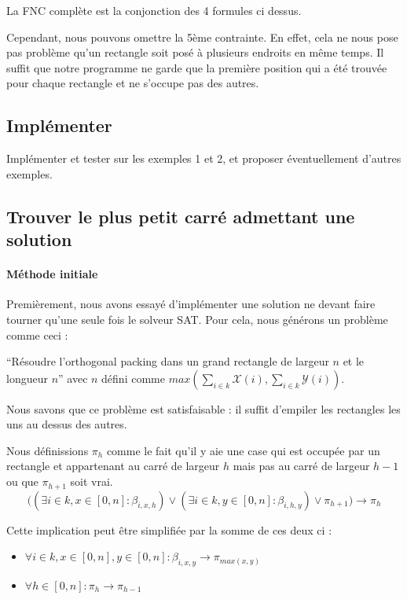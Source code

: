 \documentclass[a4paper]{article}
\begin{document}
La FNC complète est la conjonction des 4 formules ci dessus.

Cependant, nous pouvons omettre la 5ème contrainte. En effet, cela ne nous pose pas problème qu'un rectangle soit posé à plusieurs endroits en même temps. Il suffit que notre programme ne garde que la première position qui a été trouvée pour chaque rectangle et ne s'occupe pas des autres.

\subsection{Implémenter}

Implémenter et tester sur les exemples 1 et 2, et proposer éventuellement
d’autres exemples.

\subsection{Trouver le plus petit carré admettant une solution}

\paragraph{Méthode initiale} Premièrement, nous avons essayé d'implémenter une solution ne devant faire tourner qu'une seule fois le solveur SAT.
Pour cela, nous générons un problème comme ceci :

``Résoudre l'orthogonal packing dans un grand rectangle de largeur $n$ et le longueur $n$'' avec $n$ défini comme $max(\sum_{i \in k} \mathcal{X}(i), \sum_{i \in k} \mathcal{Y}(i))$.

Nous savons que ce problème est satisfaisable : il suffit d’empiler les rectangles les uns au dessus des autres.

Nous définissions $\pi_h$ comme le fait qu'il y aie une case qui est occupée par un rectangle et appartenant au carré de largeur $h$ mais pas au carré de largeur $h-1$ ou que $\pi_{h+1}$ soit vrai.
$$
  \Big(
    (\exists i \in k, x \in [0, n]: \beta_{i, x, h})
    \lor (\exists i \in k, y \in [0, n]: \beta_{i, h, y})
    \lor \pi_{h+1}
    \Big)
    \rightarrow \pi_h
$$

Cette implication peut être simplifiée par la somme de ces deux ci :
\begin{itemize}
  \item $\forall i \in k, x \in [0,n], y \in [0,n] :\beta_{i, x, y} \rightarrow \pi_{max(x,y)}$
  \item $\forall h \in [0, n]: \pi_h \rightarrow \pi_{h-1}$
\end{itemize}
\vspace{1em}
\end{document}
